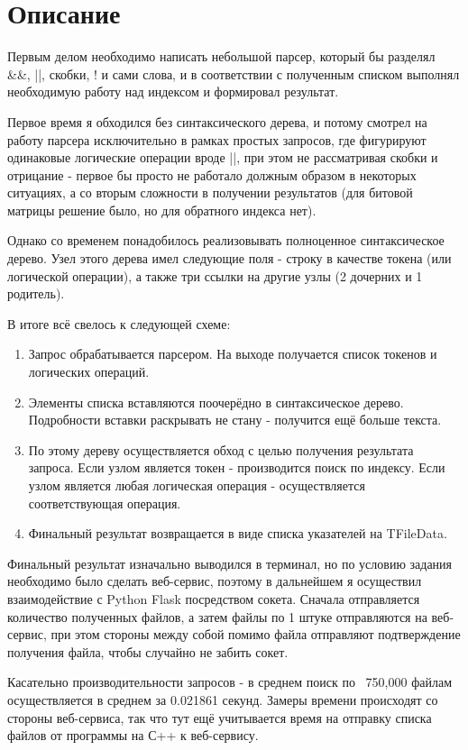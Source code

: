 \section{Описание}

Первым делом необходимо написать небольшой парсер, который бы разделял \&\&, ||, скобки, ! и сами слова, и в соответствии с полученным списком выполнял необходимую работу над индексом и формировал результат.

Первое время я обходился без синтаксического дерева, и потому смотрел на работу парсера исключительно в рамках простых запросов, где фигурируют одинаковые логические операции вроде ||, при этом не рассматривая скобки и отрицание - первое бы просто не работало должным образом в некоторых ситуациях, а со вторым сложности в получении результатов (для битовой матрицы решение было, но для обратного индекса нет).

Однако со временем понадобилось реализовывать полноценное синтаксическое дерево. Узел этого дерева имел следующие поля - строку в качестве токена (или логической операции), а также три ссылки на другие узлы (2 дочерних и 1 родитель).

В итоге всё свелось к следующей схеме:
\begin{enumerate}
    \item Запрос обрабатывается парсером. На выходе получается список токенов и логических операций.
    \item Элементы списка вставляются поочерёдно в синтаксическое дерево. Подробности вставки раскрывать не стану - получится ещё больше текста.
    \item По этому дереву осуществляется обход с целью получения результата запроса. Если узлом является токен - производится поиск по индексу. Если узлом является любая логическая операция - осуществляется соответствующая операция.
    \item Финальный результат возвращается в виде списка указателей на TFileData.
\end{enumerate}

Финальный результат изначально выводился в терминал, но по условию задания необходимо было сделать веб-сервис, поэтому в дальнейшем я осуществил взаимодействие с Python Flask посредством сокета. Сначала отправляется количество полученных файлов, а затем файлы по 1 штуке отправляются на веб-сервис, при этом стороны между собой помимо файла отправляют подтверждение получения файла, чтобы случайно не забить сокет.

Касательно производительности запросов - в среднем поиск по ~750,000 файлам осуществляется в среднем за 0.021861 секунд. Замеры времени происходят со стороны веб-сервиса, так что тут ещё учитывается время на отправку списка файлов от программы на С++ к веб-сервису.

